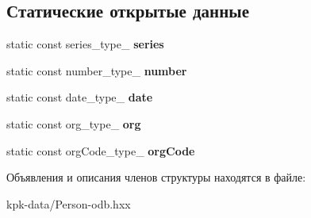 \subsection*{Статические открытые данные}
\begin{DoxyCompactItemize}
\item 
static const series\+\_\+type\+\_\+ {\bfseries series}\hypertarget{structodb_1_1query__columns_3_01_1_1kpk_1_1data_1_1_person_00_01id__pgsql_00_01_a_01_4_1_1passport__class___a21543b45f14725294c4d3bed17178484}{}\label{structodb_1_1query__columns_3_01_1_1kpk_1_1data_1_1_person_00_01id__pgsql_00_01_a_01_4_1_1passport__class___a21543b45f14725294c4d3bed17178484}

\item 
static const number\+\_\+type\+\_\+ {\bfseries number}\hypertarget{structodb_1_1query__columns_3_01_1_1kpk_1_1data_1_1_person_00_01id__pgsql_00_01_a_01_4_1_1passport__class___a67c0a88dcc08fc158ea92bd09f2efc91}{}\label{structodb_1_1query__columns_3_01_1_1kpk_1_1data_1_1_person_00_01id__pgsql_00_01_a_01_4_1_1passport__class___a67c0a88dcc08fc158ea92bd09f2efc91}

\item 
static const date\+\_\+type\+\_\+ {\bfseries date}\hypertarget{structodb_1_1query__columns_3_01_1_1kpk_1_1data_1_1_person_00_01id__pgsql_00_01_a_01_4_1_1passport__class___a24e685bcfbf853bdb86791d5b57a8af7}{}\label{structodb_1_1query__columns_3_01_1_1kpk_1_1data_1_1_person_00_01id__pgsql_00_01_a_01_4_1_1passport__class___a24e685bcfbf853bdb86791d5b57a8af7}

\item 
static const org\+\_\+type\+\_\+ {\bfseries org}\hypertarget{structodb_1_1query__columns_3_01_1_1kpk_1_1data_1_1_person_00_01id__pgsql_00_01_a_01_4_1_1passport__class___abc94af4a6f1070282b15ad31dc8a91b3}{}\label{structodb_1_1query__columns_3_01_1_1kpk_1_1data_1_1_person_00_01id__pgsql_00_01_a_01_4_1_1passport__class___abc94af4a6f1070282b15ad31dc8a91b3}

\item 
static const org\+Code\+\_\+type\+\_\+ {\bfseries org\+Code}\hypertarget{structodb_1_1query__columns_3_01_1_1kpk_1_1data_1_1_person_00_01id__pgsql_00_01_a_01_4_1_1passport__class___ae1dd8da6a13033581f52d4c15e961357}{}\label{structodb_1_1query__columns_3_01_1_1kpk_1_1data_1_1_person_00_01id__pgsql_00_01_a_01_4_1_1passport__class___ae1dd8da6a13033581f52d4c15e961357}

\end{DoxyCompactItemize}


Объявления и описания членов структуры находятся в файле\+:\begin{DoxyCompactItemize}
\item 
kpk-\/data/Person-\/odb.\+hxx\end{DoxyCompactItemize}
